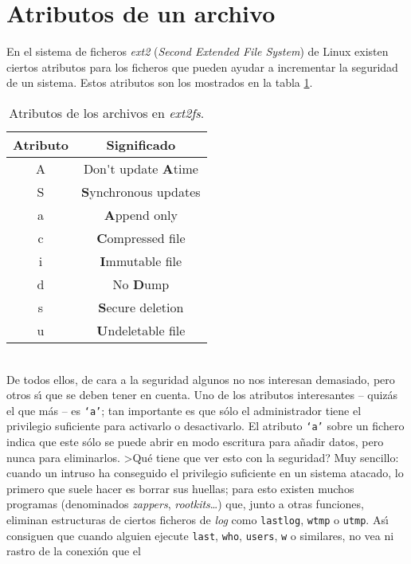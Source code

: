 \section{Atributos de un archivo}
En el sistema de ficheros {\it ext2} ({\it Second Extended File System}) de 
Linux existen ciertos atributos para los ficheros que pueden ayudar a 
incrementar la seguridad de un sistema. Estos atributos son los mostrados en
la tabla \ref{attr}.\\
\begin{table}
\begin{center}
\begin{tabular}{|c||c|}
\hline
Atributo & Significado\\
\hline\hline
A & Don\'{}t update {\bf A}time\\
\hline
S & {\bf S}ynchronous updates\\
\hline
a & {\bf A}ppend only\\
\hline
c & {\bf C}ompressed file\\
\hline
i & {\bf I}mmutable file\\
\hline
d & No {\bf D}ump\\
\hline
s & {\bf S}ecure deletion\\
\hline
u & {\bf U}ndeletable file\\
\hline
\end{tabular}
\end{center}
\caption{Atributos de los archivos en {\it ext2fs}.}
\label{attr}
\end{table}
\\De todos ellos, de cara a la seguridad algunos no nos interesan demasiado,
pero otros s\'{\i} que se deben tener en cuenta. Uno de los atributos 
interesantes -- quiz\'as el que m\'as -- es {\tt `a'}; tan importante es que 
s\'olo el administrador tiene el privilegio suficiente para activarlo o 
desactivarlo.  El atributo {\tt `a'} sobre un fichero indica que este s\'olo se 
puede abrir en modo escritura para a\~nadir datos, pero nunca para eliminarlos.
>Qu\'e tiene que ver esto con la seguridad? Muy sencillo: cuando un intruso ha
conseguido el privilegio suficiente en un sistema atacado, lo primero que suele
hacer es borrar sus huellas; para esto existen muchos programas (denominados
{\it zappers}, {\it rootkits}\ldots) que, junto a otras funciones, eliminan
estructuras de ciertos ficheros de {\it log} como {\tt lastlog}, {\tt wtmp} o
{\tt utmp}. As\'{\i} consiguen que cuando alguien ejecute {\tt last}, {\tt who},
{\tt users}, {\tt w} o similares, no vea ni rastro de la conexi\'on que el
